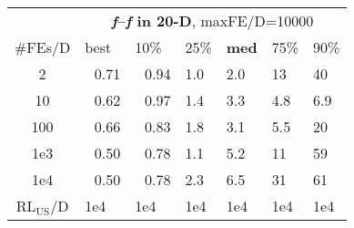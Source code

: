 \begin{tabular}{c|llllll}
 & \multicolumn{6}{|c}{\textbf{\textit{f}\raisebox{-0.35ex}{1}--\textit{f}\raisebox{-0.35ex}{24} in 20-D}, maxFE/D=10000}\\
\#FEs/D & best & 10\% & 25\% & \textbf{med} & 75\% & 90\%\\
2 & ~\,0.71 & ~\,0.94 & \hspace*{1ex}1.0 & \hspace*{1ex}2.0 & 13 & 40\\
10 & ~\,0.62 & ~\,0.97 & \hspace*{1ex}1.4 & \hspace*{1ex}3.3 & \hspace*{1ex}4.8 & \hspace*{1ex}6.9\\
100 & ~\,0.66 & ~\,0.83 & \hspace*{1ex}1.8 & \hspace*{1ex}3.1 & \hspace*{1ex}5.5 & 20\\
1e3 & ~\,0.50 & ~\,0.78 & \hspace*{1ex}1.1 & \hspace*{1ex}5.2 & 11 & 59\\
1e4 & ~\,0.50 & ~\,0.78 & \hspace*{1ex}2.3 & \hspace*{1ex}6.5 & 31 & 61\\
$\text{RL}_{\text{US}}$/D & 1e4 & 1e4 & 1e4 & 1e4 & 1e4 & 1e4
\end{tabular}
